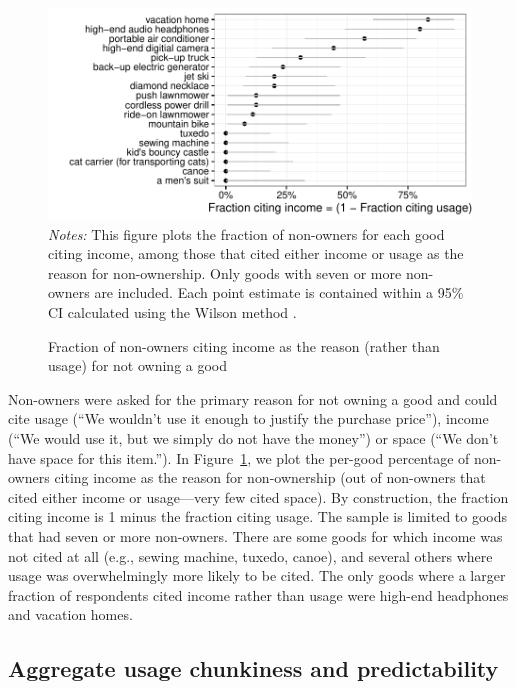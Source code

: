 \documentclass[11pt]{article}
\begin{document}
\begin{figure}
\centering 
\caption{Fraction of non-owners citing income as the reason (rather than usage) for not owning a good} 
\label{fig:reasons}
\begin{minipage}{0.9 \linewidth}
    \includegraphics[width = \linewidth]{./plots/reasons.pdf} \\
    {\footnotesize
  \emph{Notes:} This figure plots the fraction of non-owners for each good citing income, among those that cited either income or usage as the reason for non-ownership.
  Only goods with seven or more non-owners are included.
  Each point estimate is contained within a 95\% CI calculated using the Wilson method \citep{wilson1927}. 
  }
\end{minipage} 
\end{figure} 

Non-owners were asked for the primary reason for not owning a good and could cite usage (``We wouldn't use it enough to justify the purchase price''), income  (``We would use it, but we simply do not have the money'') or space (``We don't have space for this item.'').
In Figure~\ref{fig:reasons}, we plot the per-good percentage of non-owners citing income as the reason for non-ownership (out of non-owners that cited either income or usage---very few cited space).
By construction, the fraction citing income is 1 minus the fraction citing usage. 
The sample is limited to goods that had seven or more non-owners. 
There are some goods for which income was not cited at all (e.g., sewing machine, tuxedo, canoe), and several others where usage was overwhelmingly more likely to be cited.
The only goods where a larger fraction of respondents cited income rather than usage were high-end headphones and vacation homes. 

\subsection{Aggregate usage chunkiness and predictability} 
\end{document}
